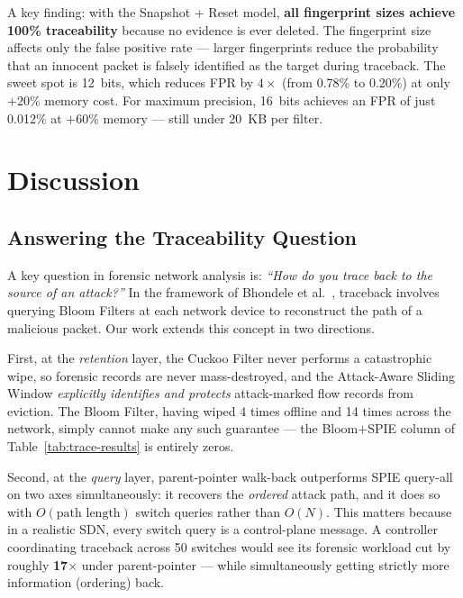 \documentclass[12pt, a4paper]{report}
\begin{document}
A key finding: with the Snapshot + Reset model, \textbf{all fingerprint
sizes achieve 100\% traceability} because no evidence is ever deleted.
The fingerprint size affects only the false positive rate --- larger
fingerprints reduce the probability that an innocent packet is falsely
identified as the target during traceback. The sweet spot is 12~bits,
which reduces FPR by $4\times$ (from 0.78\% to 0.20\%) at only $+20\%$
memory cost. For maximum precision, 16~bits achieves an FPR of just
0.012\% at $+60\%$ memory --- still under 20~KB per filter.

\chapter{Discussion}

\section{Answering the Traceability Question}

A key question in forensic network analysis is: \textit{``How do you
trace back to the source of an attack?''} In the framework of Bhondele
et al.\ \cite{shesha2015}, traceback involves querying Bloom Filters at
each network device to reconstruct the path of a malicious packet. Our
work extends this concept in two directions.

First, at the \textit{retention} layer, the Cuckoo Filter never performs
a catastrophic wipe, so forensic records are never mass-destroyed, and
the Attack-Aware Sliding Window \textit{explicitly identifies and
protects} attack-marked flow records from eviction. The Bloom Filter,
having wiped 4 times offline and 14 times across the network, simply
cannot make any such guarantee --- the Bloom$+$SPIE column of
Table~\ref{tab:trace-results} is entirely zeros.

Second, at the \textit{query} layer, parent-pointer walk-back
outperforms SPIE query-all on two axes simultaneously: it recovers the
\textit{ordered} attack path, and it does so with $O(\text{path
length})$ switch queries rather than $O(N)$. This matters because in
a realistic SDN, every switch query is a control-plane message. A
controller coordinating traceback across 50 switches would see its
forensic workload cut by roughly \textbf{17$\times$} under
parent-pointer --- while simultaneously getting strictly more
information (ordering) back.
\end{document}

